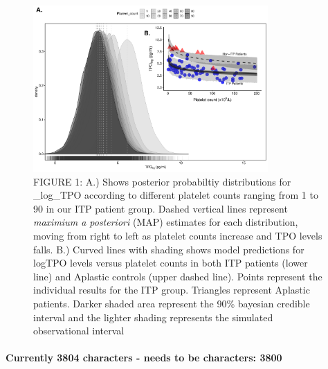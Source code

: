 \documentclass[11pt]{article}
\begin{document}

\begin{figure}
\includegraphics[width=0.8\textwidth]{ABS_v4_g1.pdf}
\caption {FIGURE 1: A.) Shows posterior probabiltiy distributions for _log_TPO according to different platelet counts ranging from 1 to 90 in our ITP patient group. Dashed vertical lines represent \textit{maximium a posteriori} (MAP) estimates for each distribution, moving from right to left as platelet counts increase and TPO levels falls. B.) Curved lines with shading shows model predictions for logTPO levels versus platelet counts in both ITP patients (lower line) and Aplastic controls (upper dashed line). Points represent the individual results for the ITP group. Triangles represent Aplastic patients. Darker shaded area represent the 90\% bayesian credible interval and the lighter shading represents the simulated observational interval}
\end{figure}





\paragraph{}
\textbf{Currently 3804 characters - needs to be characters: 3800}
\end{document}

